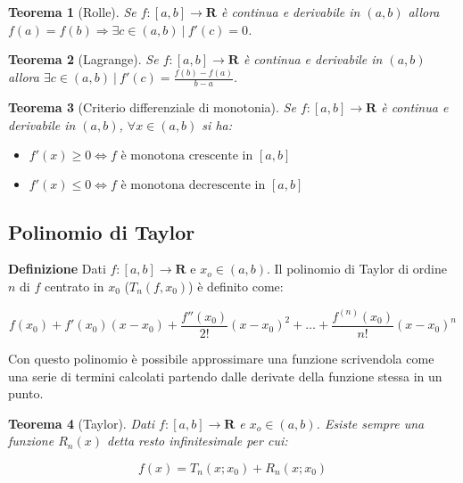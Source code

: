 \documentclass{article}
\newtheorem{theorem}{Teorema}
\begin{document}
\begin{theorem}[Rolle]
    Se $f:[a,b]\rightarrow\mathbf{R}$ è continua e derivabile in $(a,b)$ allora $f(a)=f(b)\Rightarrow\exists c\in (a,b)\ |\ f'(c)=0$.\newline
\end{theorem}

\begin{theorem}[Lagrange]
    Se $f:[a,b]\rightarrow\mathbf{R}$ è continua e derivabile in $(a,b)$ allora $\exists c\in (a,b)\ |\ f'(c)=\frac{f(b)-f(a)}{b-a}$.\newline
\end{theorem}

\begin{theorem}[Criterio differenziale di monotonia]
    Se $f:[a,b]\rightarrow\mathbf{R}$ è continua e derivabile in $(a,b)$, $\forall x\in(a,b)$ si ha:
    \begin{itemize}
        \item $f'(x)\geq0\iff f\text{ è monotona crescente in }[a,b]$
        \item $f'(x)\leq0\iff f\text{ è monotona decrescente in }[a,b]$\newline
    \end{itemize}
    
\end{theorem}

\subsection{Polinomio di Taylor}

\textbf{Definizione} Dati $f:[a,b]\rightarrow\mathbf{R}$ e $x_o\in(a,b)$. Il polinomio di Taylor di ordine $n$ di $f$ centrato in $x_0$ ($T_n(f,x_0)$) è definito come:

$$f(x_0)+f'(x_0)(x-x_0)+\frac{f''(x_0)}{2!}(x-x_0)^2+\ldots+\frac{f^{(n)}(x_0)}{n!}(x-x_0)^n$$\newline

\noindent Con questo polinomio è possibile approssimare una funzione scrivendola come una serie di termini calcolati partendo dalle derivate della funzione stessa in un punto.\newline

\begin{theorem}[Taylor]
    Dati $f:[a,b]\rightarrow\mathbf{R}$ e $x_o\in(a,b)$. Esiste sempre una funzione $R_n(x)$ detta resto infinitesimale per cui:

    $$f(x)=T_n(x;x_0)+R_n(x;x_0)$$
    
\end{theorem}
\end{document}
